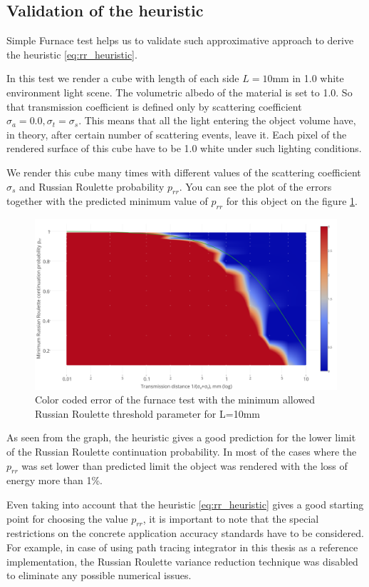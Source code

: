 \subsection{Validation of the heuristic}
Simple Furnace test helps us to validate such approximative approach to derive the heuristic
\ref{eq:rr_heuristic}.

In this test we render a cube with length of each side $L=10$mm in 1.0 white environment light scene.
The volumetric albedo of the material is set to 1.0. So that transmission coefficient is defined
only by scattering coefficient $\sigma_a=0.0, \sigma_t=\sigma_s$. This means that all the light
entering the object volume have, in theory, after certain number of scattering events, leave it.
Each pixel of the rendered surface of this cube have to be 1.0 white under such lighting conditions.

We render this cube many times with different values of the scattering coefficient $\sigma_s$ and
Russian Roulette probability $p_{rr}$. You can see the plot of the errors together with the
predicted minimum value of $p_{rr}$ for this object on the figure \ref{fig:rr_heuristic_heatmap}.
\begin{figure}[h]
    \centering
    \includegraphics[width=\textwidth]{imgs/plots/rr_heuristic_heatmap}
    \caption{Color coded error of the furnace test with the minimum allowed Russian Roulette
    threshold parameter for L=10mm}
    \label{fig:rr_heuristic_heatmap}
\end{figure}

As seen from the graph, the heuristic gives a good prediction for the lower limit of the  Russian
Roulette continuation probability. In most of the cases where the $p_{rr}$ was set lower than
predicted limit the object was rendered with the loss of energy more than 1\%.

Even taking into account that the heuristic \ref{eq:rr_heuristic} gives a good starting point for
choosing the value $p_{rr}$, it is important to note that the special restrictions on the concrete
application accuracy standards have to be considered. For example, in case of using path
tracing integrator in this thesis as a reference implementation, the Russian Roulette variance
reduction technique was disabled to eliminate any possible numerical issues.

\clearpage